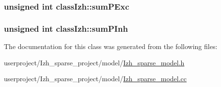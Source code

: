 \hypertarget{classclassIzh_a494e8cf8484db99c98dcdfd8bd3b34d7}{
\subsubsection[{sum\+P\+Exc}]{\setlength{\rightskip}{0pt plus 5cm}unsigned int class\+Izh\+::sum\+P\+Exc}}\label{classclassIzh_a494e8cf8484db99c98dcdfd8bd3b34d7}
\hypertarget{classclassIzh_a031b848aecec82eb395587455fe54860}{
\subsubsection[{sum\+P\+Inh}]{\setlength{\rightskip}{0pt plus 5cm}unsigned int class\+Izh\+::sum\+P\+Inh}}\label{classclassIzh_a031b848aecec82eb395587455fe54860}


The documentation for this class was generated from the following files\+:\begin{DoxyCompactItemize}
\item 
userproject/\+Izh\+\_\+sparse\+\_\+project/model/\hyperlink{Izh__sparse__model_8h}{Izh\+\_\+sparse\+\_\+model.\+h}\item 
userproject/\+Izh\+\_\+sparse\+\_\+project/model/\hyperlink{Izh__sparse__model_8cc}{Izh\+\_\+sparse\+\_\+model.\+cc}\end{DoxyCompactItemize}
